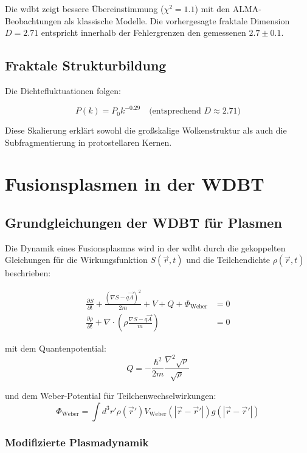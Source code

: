 Die \gls{wdbt} zeigt bessere Übereinstimmung ($\chi^2 = 1.1$) mit den ALMA-Beobachtungen als klassische Modelle. Die vorhergesagte fraktale Dimension $D = 2.71$ entspricht innerhalb der Fehlergrenzen den gemessenen $2.7 \pm 0.1$.

\section{Fraktale Strukturbildung}
Die Dichtefluktuationen folgen:

\begin{equation}
P(k) = P_0 k^{-0.29} \quad \text{(entsprechend } D \approx 2.71\text{)}
\end{equation}

Diese Skalierung erklärt sowohl die großskalige Wolkenstruktur als auch die Subfragmentierung in protostellaren Kernen.

\chapter{Fusionsplasmen in der WDBT}
\section{Grundgleichungen der WDBT für Plasmen}

Die Dynamik eines Fusionsplasmas wird in der \gls{wdbt} durch die gekoppelten Gleichungen für die Wirkungsfunktion $S(\vec{r},t)$ und die Teilchendichte $\rho(\vec{r},t)$ beschrieben:

\begin{align}
\frac{\partial S}{\partial t} + \frac{(\nabla S - q\vec{A})^2}{2m} + V + Q + \Phi_{\text{Weber}} &= 0 \label{eq:C1} \\
\frac{\partial \rho}{\partial t} + \nabla \cdot \left(\rho \frac{\nabla S - q\vec{A}}{m}\right) &= 0 \label{eq:C2}
\end{align}

mit dem Quantenpotential:
\begin{equation}
Q = -\frac{\hbar^2}{2m} \frac{\nabla^2 \sqrt{\rho}}{\sqrt{\rho}} \label{eq:Q}
\end{equation}

und dem Weber-Potential für Teilchenwechselwirkungen:
\begin{equation}
\Phi_{\text{Weber}} = \int d^3r' \rho(\vec{r}') V_{\text{Weber}}(|\vec{r}-\vec{r}'|) g(|\vec{r}-\vec{r}'|)
\end{equation}

\subsection{Modifizierte Plasmadynamik}

